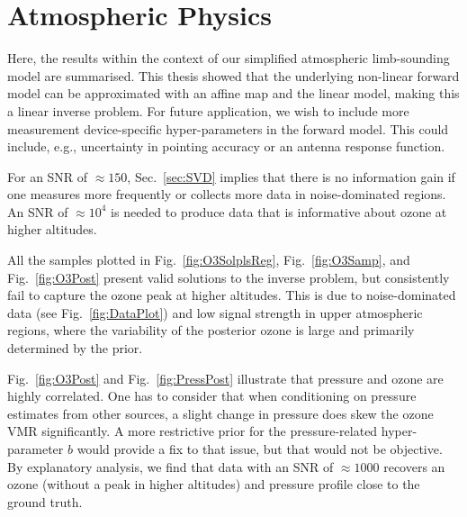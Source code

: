 \section{Atmospheric Physics}
Here, the results within the context of our simplified atmospheric limb-sounding model are summarised.
This thesis showed that the underlying non-linear forward model can be approximated with an affine map and the linear model, making this a linear inverse problem.
For future application, we wish to include more measurement device-specific hyper-parameters in the forward model.
This could include, e.g., uncertainty in pointing accuracy or an antenna response function.

For an SNR of $\approx150$, Sec.~\ref{sec:SVD} implies that there is no information gain if one measures more frequently or collects more data in noise-dominated regions.
An SNR of $\approx10^4$ is needed to produce data that is informative about ozone at higher altitudes.

All the samples plotted in Fig.~\ref{fig:O3SolplsReg}, Fig.~\ref{fig:O3Samp}, and Fig.~\ref{fig:O3Post} present valid solutions to the inverse problem, but consistently fail to capture the ozone peak at higher altitudes.
This is due to noise-dominated data (see Fig.~\ref{fig:DataPlot}) and low signal strength in upper atmospheric regions, where the variability of the posterior ozone is large and primarily determined by the prior.

Fig.~\ref{fig:O3Post} and Fig.~\ref{fig:PressPost} illustrate that pressure and ozone are highly correlated.
One has to consider that when conditioning on pressure estimates from other sources, a slight change in pressure does skew the ozone VMR significantly.
A more restrictive prior for the pressure-related hyper-parameter $b$ would provide a fix to that issue, but that would not be objective.
By explanatory analysis, we find that data with an SNR of $\approx 1000$ recovers an ozone (without a peak in higher altitudes) and pressure profile close to the ground truth.



